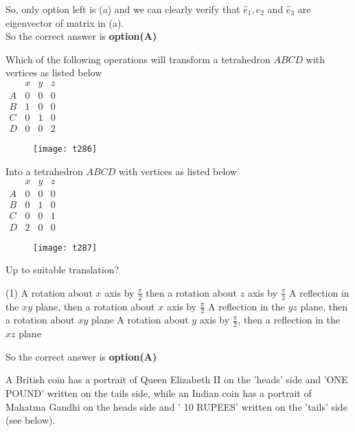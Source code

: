 \begin{questions}
\begin{answer}
	So, only option left is (a) and we can clearly verify that $\hat{e}_{1}, \hat{e}_{2}$ and $\hat{e}_{3}$ are eigenvector of matrix in (a).\\
	So the correct answer is \textbf{option(A)}
\end{answer}
\begin{minipage}{\textwidth}
	\question Which of the following operations will transform a tetrahedron $A B C D$ with vertices as listed below\\
	$\begin{array}{lllll} & x & y & z \\ A & 0 & 0 & 0 \\ B & 1 & 0 & 0 \\ C & 0 & 1 & 0 \\ D & 0 & 0 & 2\end{array}$\\
	\begin{figure}[H]
		\centering
		\texttt{[image: t286]}
	\end{figure}
	Into a tetrahedron $A B C D$ with vertices as listed below\\
	$\begin{array}{cccc} & x & y & z \\ A & 0 & 0 & 0 \\ B & 0 & 1 & 0 \\ C & 0 & 0 & 1 \\ D & 2 & 0 & 0\end{array}$\\
	\begin{figure}[H]
		\centering
		\texttt{[image: t287]}
	\end{figure}
	Up to suitable translation?
\end{minipage}
\begin{tasks}(1)
	\task[\textbf{A.}]   A rotation about $x$ axis by $\frac{\pi}{2}$ then a rotation about $z$ axis by $\frac{\pi}{2}$
	\task[\textbf{B.}]   A reflection in the $x y$ plane, then a rotation about $x$ axis by $\frac{\pi}{2}$
	\task[\textbf{C.}] A reflection in the $y z$ plane, then a rotation about $x y$ plane
	\task[\textbf{D.}] A rotation about $y$ axis by $\frac{\pi}{2}$, then a reflection in the $x z$ plane
\end{tasks}
\begin{answer}
	So the correct answer is \textbf{option(A)}
\end{answer}
\begin{minipage}{\textwidth}
	\question A British coin has a portrait of Queen Elizabeth II on the 'heads' side and 'ONE POUND' written on the tails side, while an Indian coin has a portrait of Mahatma Gandhi on the heads side and ' 10 RUPEES' written on the 'tails' side (see below).\\

\end{minipage}
\end{questions}
